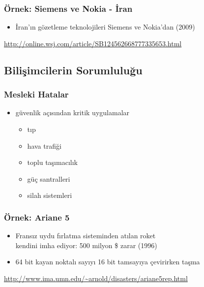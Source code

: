 \documentclass[dvipsnames]{beamer}
\theoremstyle{definition}
\theoremstyle{example}
\theoremstyle{plain}
\begin{document}
\begin{frame}
  \frametitle{Örnek: Siemens ve Nokia - İran}

  \begin{center}
  \end{center}

  \begin{itemize}
    \item İran'ın gözetleme teknolojileri Siemens ve Nokia'dan (2009)
  \end{itemize}

  \medskip
  \tiny{\url{http://online.wsj.com/article/SB124562668777335653.html}}\\
\end{frame}

\subsection{Bilişimcilerin Sorumluluğu}

\begin{frame}
  \frametitle{Mesleki Hatalar}

  \begin{itemize}
    \item güvenlik açısından kritik uygulamalar
    \begin{itemize}
      \item tıp
      \item hava trafiği
      \item toplu taşımacılık
      \item güç santralleri
      \item silah sistemleri
    \end{itemize}
  \end{itemize}
\end{frame}

\begin{frame}
  \frametitle{Örnek: Ariane 5}

  \begin{center}
  \end{center}

  \begin{itemize}
    \item Fransız uydu fırlatma sisteminden atılan roket\\
      kendini imha ediyor: 500 milyon \$ zarar (1996)

    \item 64 bit kayan noktalı sayıyı 16 bit tamsayıya çevirirken taşma
  \end{itemize}

  \medskip
  \tiny{\url{http://www.ima.umn.edu/~arnold/disasters/ariane5rep.html}}\\
\end{frame}
\end{document}
